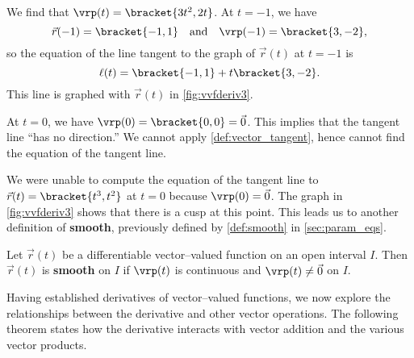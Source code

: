 
{We find that $\vrp(t) =\bracket{3t^2,2t}$. At $t=-1$, we have
\[\vec r(-1) =\bracket{-1,1}\quad \text{and}\quad \vrp(-1) =\bracket{3,-2},\]
so the equation of the line tangent to the graph of $\vec r(t)$ at $t=-1$ is
\[\ell(t) =\bracket{-1,1}+ t\bracket{3,-2}.\]
This line is graphed with $\vec r(t)$ in \autoref{fig:vvfderiv3}.

At $t=0$, we have $\vrp(0) =\bracket{0,0}=\vec 0$. This implies that the tangent line ``has no direction.'' We cannot apply \autoref{def:vector_tangent}, hence cannot find the equation of the tangent line.}

We were unable to compute the equation of the tangent line to $\vec r(t)=\bracket{t^3,t^2}$ at $t=0$ because $\vrp(0) = \vec 0$. The graph in \autoref{fig:vvfderiv3} shows that there is a cusp at this point. This leads us to another definition of \textbf{smooth}, previously defined by \autoref{def:smooth} in \autoref{sec:param_eqs}.

{Let $\vec r(t)$ be a differentiable vector--valued function on an open interval $I$. Then $\vec r(t)$ is \textbf{smooth} on $I$ if $\vrp(t)$ is continuous and $\vrp(t)\neq \vec 0$ on $I$.
}

Having established derivatives of vector--valued functions, we now explore the relationships between the derivative and other vector operations. The following theorem states how the derivative interacts with vector addition and the various vector products.

